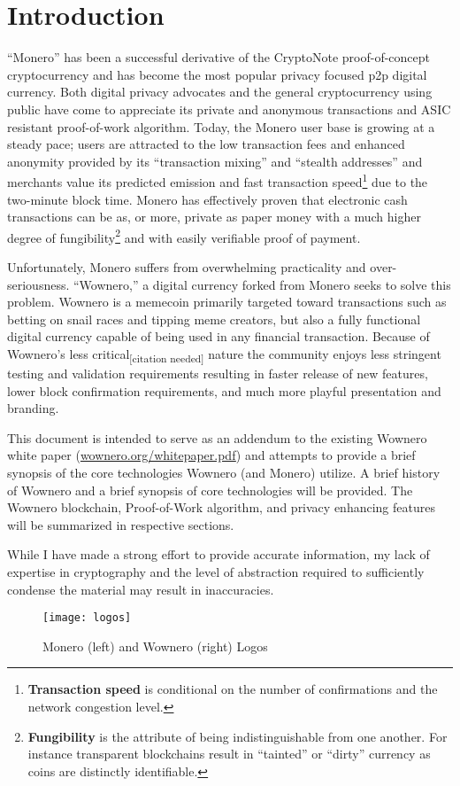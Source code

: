 \section{Introduction}
``Monero''\cite{monero_about,zero2monero,monero_repo} has been a successful derivative of the CryptoNote\cite{CryptoNote} proof-of-concept cryptocurrency and has become the most popular privacy focused p2p digital currency. Both digital privacy advocates and the general cryptocurrency using public have come to appreciate its private and anonymous transactions and ASIC resistant proof-of-work algorithm. Today, the Monero user base is growing at a steady pace\cite{acceptedhere}; users are attracted to the low transaction fees and enhanced anonymity provided by its ``transaction mixing'' and ``stealth addresses''\cite{monerohow_btc_vs} and merchants value its predicted emission and fast transaction speed\footnote{\textbf{Transaction speed} is conditional on the number of confirmations and the network congestion level.} due to the two-minute block time. Monero has effectively proven that electronic cash transactions can be as, or more, private as paper money with a much higher degree of fungibility\footnote{\textbf{Fungibility} is the attribute of being indistinguishable from one another\cite{moneropedia}. For instance transparent blockchains result in ``tainted'' or ``dirty'' currency as coins are distinctly identifiable.} and with easily verifiable proof of payment\cite{proofofpayment}.

Unfortunately, Monero suffers from overwhelming practicality and over-seriousness. ``Wownero,''\cite{wowbsite} a digital currency forked from Monero\cite{monero_repo, wowrepo} seeks to solve this problem. Wownero is a memecoin primarily targeted toward transactions such as betting on snail races and tipping meme creators, but also a fully functional digital currency capable of being used in any financial transaction\cite{wowbsite}. Because of Wownero's less critical\textsubscript{[citation needed]} nature the community enjoys less stringent testing and validation requirements resulting in faster release of new features, lower block confirmation requirements, and much more playful presentation and branding\cite{slimecash}.

This document is intended to serve as an addendum to the existing Wownero white paper (\url{wownero.org/whitepaper.pdf}) and attempts to provide a brief synopsis of the core technologies Wownero (and Monero) utilize. A brief history of Wownero and a brief synopsis of core technologies will be provided. The Wownero blockchain, Proof-of-Work algorithm, and privacy enhancing features will be summarized in respective sections. 

While I have made a strong effort to provide accurate information, my lack of expertise in cryptography and the level of abstraction required to sufficiently condense the material may result in inaccuracies.

\begin{figure}[H]
    \centering
    \texttt{[image: logos]}
    \caption{
        Monero (left) and Wownero (right) Logos
    }
    \label{fig:logos}
\end{figure}

